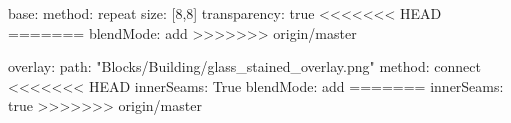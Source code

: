 base:
  method: repeat
  size: [8,8]
  transparency: true
<<<<<<< HEAD
=======
  blendMode: add
>>>>>>> origin/master
  
overlay:
  path: "Blocks/Building/glass_stained_overlay.png"
  method: connect
<<<<<<< HEAD
  innerSeams: True
blendMode: add
=======
  innerSeams: true
>>>>>>> origin/master
